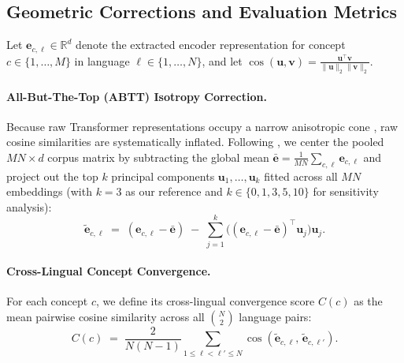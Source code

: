 \subsection{Geometric Corrections and Evaluation Metrics}

Let $\mathbf{e}_{c,\ell} \in \mathbb{R}^d$ denote the extracted encoder representation for concept $c \in \{1, \dots, M\}$ in language $\ell \in \{1, \dots, N\}$, and let $\cos(\mathbf{u}, \mathbf{v}) = \frac{\mathbf{u}^\top \mathbf{v}}{\|\mathbf{u}\|_2 \|\mathbf{v}\|_2}$.

\paragraph{All-But-The-Top (ABTT) Isotropy Correction.}
Because raw Transformer representations occupy a narrow anisotropic cone \citep{ethayarajh2019,rajaee2022}, raw cosine similarities are systematically inflated.
Following \citet{mu2018}, we center the pooled $MN \times d$ corpus matrix by subtracting the global mean $\bar{\mathbf{e}} = \frac{1}{MN}\sum_{c,\ell}\mathbf{e}_{c,\ell}$ and project out the top $k$ principal components $\mathbf{u}_1, \dots, \mathbf{u}_k$ fitted across all $MN$ embeddings (with $k = 3$ as our reference and $k \in \{0, 1, 3, 5, 10\}$ for sensitivity analysis):
\begin{equation}
\tilde{\mathbf{e}}_{c,\ell} \;=\; (\mathbf{e}_{c,\ell} - \bar{\mathbf{e}}) \;-\; \sum_{j=1}^{k} \big((\mathbf{e}_{c,\ell} - \bar{\mathbf{e}})^\top \mathbf{u}_j\big)\mathbf{u}_j.
\label{eq:abtt}
\end{equation}

\paragraph{Cross-Lingual Concept Convergence.}
For each concept $c$, we define its cross-lingual convergence score $C(c)$ as the mean pairwise cosine similarity across all $\binom{N}{2}$ language pairs:
\begin{equation}
C(c) \;=\; \frac{2}{N(N-1)} \sum_{1 \le \ell < \ell' \le N} \cos(\tilde{\mathbf{e}}_{c,\ell},\, \tilde{\mathbf{e}}_{c,\ell'}).
\label{eq:convergence}
\end{equation}


